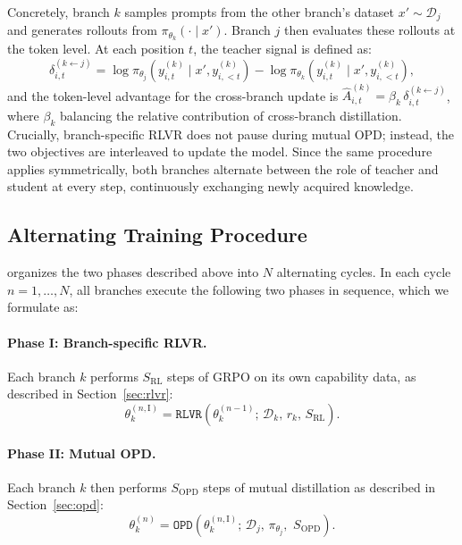 Concretely, branch $k$ samples prompts from the other branch's dataset $x' \sim \mathcal{D}_j$ and generates rollouts from $\pi_{\theta_k}(\cdot \mid x')$. Branch $j$ then evaluates these rollouts at the token level. At each position $t$, the teacher signal is defined as:
\begin{equation}
\label{eq:delta}
\delta_{i,t}^{(k \leftarrow j)}
=
\log \pi_{\theta_j}(y_{i,t}^{(k)} \mid x', y_{i,<t}^{(k)})
-
\log \pi_{\theta_k}(y_{i,t}^{(k)} \mid x', y_{i,<t}^{(k)}),
\end{equation}
and the token-level advantage for the cross-branch update is $\hat{A}_{i,t}^{(k)} = \beta_k \, \delta_{i,t}^{(k \leftarrow j)}$, where $\beta_k$ balancing the relative contribution of cross-branch distillation. 
Crucially, branch-specific RLVR does not pause during mutual OPD; instead, the two objectives are interleaved to update the model. 
Since the same procedure applies symmetrically, both branches alternate between the role of teacher and student at every step, continuously exchanging newly acquired knowledge.

\subsection{Alternating Training Procedure}

\method organizes the two phases described above into $N$ alternating cycles. In each cycle $n = 1, \ldots, N$, all branches execute the following two phases in sequence, which we formulate as:

\paragraph{Phase I: Branch-specific RLVR.}
Each branch $k$ performs $S_{\mathrm{RL}}$ steps of GRPO on its own capability data, as described in Section~\ref{sec:rlvr}:
\begin{equation}
\theta_k^{(n,\mathrm{I})}
=
\texttt{RLVR}\!\left(\theta_k^{(n-1)};\, \mathcal{D}_k,\, r_k,\, S_{\mathrm{RL}}\right).
\end{equation}

\paragraph{Phase II: Mutual OPD.}
Each branch $k$ then performs $S_{\mathrm{OPD}}$ steps of mutual distillation as described in Section~\ref{sec:opd}:
\begin{equation}
\theta_k^{(n)}
=
\texttt{OPD}\!\left(\theta_k^{(n,\mathrm{I})};\, \mathcal{D}_j,\, \pi_{\theta_j},\, \, S_{\mathrm{OPD}}\right).
\end{equation}

